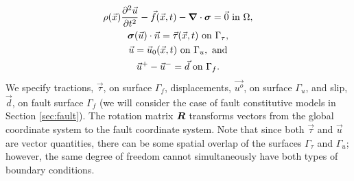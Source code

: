 \begin{gather}
\rho(\vec{x})\frac{\partial^{2}\vec{u}}{\partial t^{2}}-\vec{f}(\vec{x},t)-\bm{\nabla}\cdot\bm{\sigma}=\vec{0}\text{ in }\Omega,\\
\bm{\sigma}(\vec{u})\cdot\vec{n}=\vec{\tau}(\vec{x},t)\text{ on }\Gamma_{\tau}\text{,}\\
\vec{u}=\vec{u}_0(\vec{x},t)\text{ on }\Gamma_{u},\text{ and}\\
\vec{u}^{+}-\vec{u}^{-}=\vec{d}\text{ on }\Gamma_{f}.
\end{gather}
We specify tractions, $\vec{\tau}$, on surface $\Gamma_{f}$, displacements,
$\vec{u^{o}}$, on surface $\Gamma_{u}$, and slip, $\vec{d}$,
on fault surface $\Gamma_{f}$ (we will consider the case of fault constitutive
models in Section \vref{sec:fault}). The rotation matrix $\bm{R}$
transforms vectors from the global coordinate system to the fault
coordinate system. Note that since both $\vec{\tau}$ and
$\vec{u}$ are vector quantities, there can be some spatial
overlap of the surfaces $\Gamma_{\tau}$ and $\Gamma_{u}$; however, the same degree
of freedom cannot simultaneously have both types of boundary conditions.
